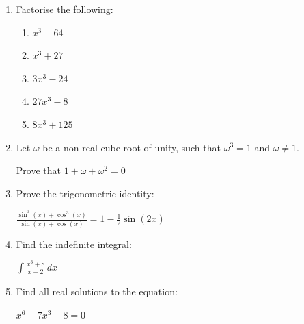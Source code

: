 \documentclass[../main.tex]{subfiles}
\begin{document}
\label{Sum or difference of cubes questions}
\begin{enumerate}
    \item Factorise the following:
    
        \begin{enumerate}
            \item $x^3 - 64$
            \item $x^3 + 27$
            \item $3x^3 - 24$
            \item $27x^3 - 8$
            \item $8x^3 + 125$
        \end{enumerate}

    \item Let $\omega$ be a non-real cube root of unity, such that $\omega^3=1$ and $\omega \neq 1$.
    
    Prove that $1+\omega+\omega ^2 = 0$

    \item Prove the trigonometric identity:
    
    $\frac{\sin^3(x)+\cos^3(x)}{\sin(x)+\cos(x)}=1-\frac{1}{2}\sin(2x)$

    \item Find the indefinite integral:
    
    $\int \frac{x^3 +8}{x+2} \,dx$

    \item Find all real solutions to the equation:
    
    $x^6 -7x^3 - 8 = 0$
    
\end{enumerate}
\end{document}
